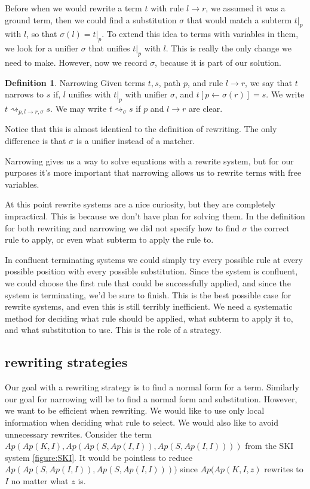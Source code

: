\documentclass{article}
\theoremstyle{definition}
\newtheorem{definition}{Definition}[section]
\begin{document}
Before when we would rewrite a term $t$ with rule $l \to r$, we assumed it was a ground term,
then we could find a substitution $\sigma$ that would match a subterm $t|_p$ with $l$,
so that $\sigma(l) = t|_p$.
To extend this idea to terms with variables in them, 
we look for a unifier $\sigma$ that unifies $t|_p$ with $l$.
This is really the only change we need to make.
However, now we record $\sigma$, because it is part of our solution.

\theoremstyle{definition}
\begin{definition}{Narrowing}
Given terms $t,s$, path $p$, and rule $l \to r$, we say that $t$ narrows to $s$ if, 
$l$ unifies with $t|_p$ with unifier $\sigma$, and $t[p \leftarrow \sigma(r)] = s$.
We write $t \rightsquigarrow_{p,l\to r,\sigma} s$.
We may write $t \rightsquigarrow_\sigma s$ if $p$ and $l \to r$ are clear.
\end{definition}

Notice that this is almost identical to the definition of rewriting.
The only difference is that $\sigma$ is a unifier instead of a matcher.

Narrowing gives us a way to solve equations with a rewrite system,
but for our purposes it's more important that narrowing allows us to
rewrite terms with free variables.

At this point rewrite systems are a nice curiosity,
but they are completely impractical. 
This is because we don't have plan for solving them.
In the definition for both rewriting and narrowing
we did not specify how to find $\sigma$ the correct rule to apply, or even
what subterm to apply the rule to.

In confluent terminating systems we could simply try every possible rule
at every possible position with every possible substitution.
Since the system is confluent, we could choose the first rule that could be successfully applied,
and since the system is terminating, we'd be sure to finish.
This is the best possible case for rewrite systems, 
and even this is still terribly inefficient.
We need a systematic method for deciding what rule should be applied,
what subterm to apply it to,
and what substitution to use.
This is the role of a strategy.

\subsection{rewriting strategies}

Our goal with a rewriting strategy is to find a normal form for a term.
Similarly our goal for narrowing will be to find a normal form and substitution.
However, we want to be efficient when rewriting.
We would like to use only local information when deciding what rule to select.
We would also like to avoid unnecessary rewrites.
Consider the term $Ap(Ap(K, I), Ap(Ap(S,Ap(I,I)),Ap(S,Ap(I,I))))$ from the SKI system \ref{figure:SKI}.
It would be pointless to reduce $Ap(Ap(S,Ap(I,I)),Ap(S,Ap(I,I))))$ since $Ap(Ap(K,I,z)$ rewrites to $I$
no matter what $z$ is.
\end{document}
